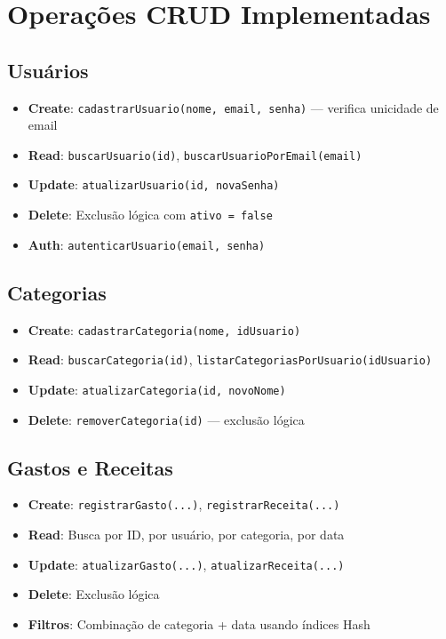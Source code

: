 \documentclass[12pt,a4paper]{article}
\begin{document}
\section{Operações CRUD Implementadas}

\subsection{Usuários}
\begin{itemize}
  \item \textbf{Create}: \texttt{cadastrarUsuario(nome, email, senha)} — verifica unicidade de email
  \item \textbf{Read}: \texttt{buscarUsuario(id)}, \texttt{buscarUsuarioPorEmail(email)}
  \item \textbf{Update}: \texttt{atualizarUsuario(id, novaSenha)}
  \item \textbf{Delete}: Exclusão lógica com \texttt{ativo = false}
  \item \textbf{Auth}: \texttt{autenticarUsuario(email, senha)}
\end{itemize}

\subsection{Categorias}
\begin{itemize}
  \item \textbf{Create}: \texttt{cadastrarCategoria(nome, idUsuario)}
  \item \textbf{Read}: \texttt{buscarCategoria(id)}, \texttt{listarCategoriasPorUsuario(idUsuario)}
  \item \textbf{Update}: \texttt{atualizarCategoria(id, novoNome)}
  \item \textbf{Delete}: \texttt{removerCategoria(id)} — exclusão lógica
\end{itemize}

\subsection{Gastos e Receitas}
\begin{itemize}
  \item \textbf{Create}: \texttt{registrarGasto(...)}, \texttt{registrarReceita(...)}
  \item \textbf{Read}: Busca por ID, por usuário, por categoria, por data
  \item \textbf{Update}: \texttt{atualizarGasto(...)}, \texttt{atualizarReceita(...)}
  \item \textbf{Delete}: Exclusão lógica
  \item \textbf{Filtros}: Combinação de categoria + data usando índices Hash
\end{itemize}
\end{document}
